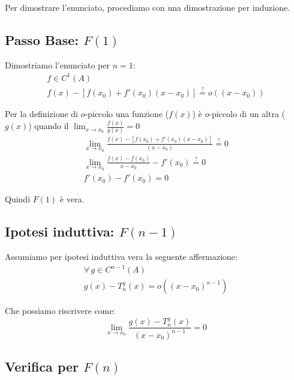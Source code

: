 \documentclass[../../dimostrazioni]{subfiles}
\begin{document}
            Per dimostrare l'enunciato, procediamo con una dimostrazione per induzione.

            \medskip

            \subsection*{Passo Base: \(F(1)\)}

                Dimostriamo l'enunciato per \(n = 1\):
                \begin{gather*}
                    f \in C^1(A)\\
                    f(x) - \left[ f(x_0) + f'(x_0)(x-x_0) \right] \stackrel{?}{=}  o ((x-x_0))
                \end{gather*}

                Per la definizione di \(o\)-piccolo una funzione (\(f(x)\)) è \(o\)-piccolo di un altra (\(g(x)\)) quando il \( \lim_{x \to x_0} \frac{f(x)}{g(x)} = 0\) 
                \begin{gather*}
                    \lim_{x \to x_0} \frac{f(x) - \left[ f(x_0) + f'(x_0)(x-x_0) \right]}{(x-x_0)} \stackrel{?}{=} 0\\
                    \lim_{x \to x_0} \frac{f(x) - f(x_0)}{x - x_0} - f'(x_0) \stackrel{?}{=} 0\\
                    f'(x_0) - f'(x_0) = 0
                \end{gather*}

                Quindi \(F(1)\) è vera. 

            \subsection*{Ipotesi induttiva: \(F(n-1)\)}

                Assumiamo per ipotesi induttiva vera la seguente affermazione:
                \begin{gather*}
                    \forall \, g \in C^{n-1} (A)\\
                    g(x) - T _n ^ g (x) = o ((x-x_0)^{n-1})
                \end{gather*}
                
                Che possiamo riscrivere come:
                \[  \lim_{x \to x_0} \frac{g(x) - T _n ^ g (x)}{(x-x_0)^{n-1}} = 0 \]

            \subsection*{Verifica per \(F(n)\)}
\end{document}
